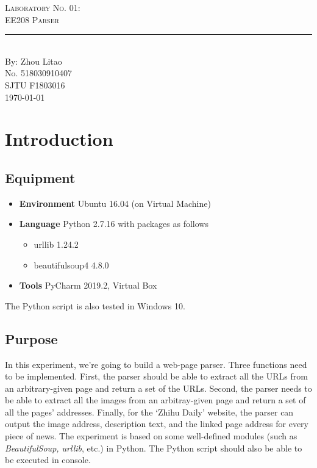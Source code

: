\documentclass{article}
\newcommand{\labno}{01}
\newcommand{\labtitle}{EE208 Parser}
\newcommand{\authorname}{Zhou Litao}
\newcommand{\studentno}{518030910407}
\newcommand{\classno}{F1803016}
\begin{document}
\begin{center}
{\LARGE \textsc{Laboratory No. \labno:} \\ \vspace{4pt}}
{\Large \textsc{\labtitle} \\ \vspace{4pt}} 
\rule[13pt]{\textwidth}{1pt} \\ \vspace{15pt}
{\large By: \authorname \\ \vspace{10pt}
No. \studentno \\ \vspace{10pt}
SJTU \classno \\ \vspace{10pt}
\today \vspace{20pt}}
\end{center}



\section{Introduction}

\subsection{Equipment}
\begin{itemize}
\item\textbf{Environment} Ubuntu 16.04 (on Virtual Machine)
\item\textbf{Language} Python 2.7.16 with packages as follows
	\begin{itemize}
	\item urllib 1.24.2
	\item beautifulsoup4 4.8.0
	\end{itemize}
\item\textbf{Tools} PyCharm 2019.2, Virtual Box
\end{itemize}
The Python script is also tested in Windows 10.

\subsection{Purpose}
In this experiment, we're going to build a web-page parser. Three functions need to be implemented. First, the parser should be able to extract all the URLs from an arbitrary-given page and return a set of the URLs. Second, the parser needs to be able to extract all the images from an arbitray-given page and return a set of all the pages' addresses. Finally, for the `Zhihu Daily' website, the parser can output the image address, description text, and the linked page address for every piece of news. The experiment is based on some well-defined modules (such as \textit{BeautifulSoup, urllib}, etc.) in Python. The Python script should also be able to be executed in console.
\end{document}
